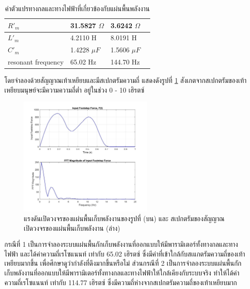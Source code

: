 \documentclass[11pt,a4paper]{article}
\begin{document}
\begin{table}[H]
\begin{tabular}{ | l | l | l | p{5cm} |}
        $R'_{m}$                                 & 31.5827 $\Omega$           & 3.6242 $\Omega$            \\ \hline
        $L'_{m}$                                 & 4.2110 H                   & 8.0191 H                   \\ \hline
        $C'_{m}$                                 & 1.4228 $\mu F$             & 1.5606 $\mu F$             \\ \hline
        resonant frequency                       & 65.02 Hz                   & 144.70 Hz                  \\ \hline
    \end{tabular}
    \caption{ค่าตัวแปรทางกลและทางไฟฟ้าที่เกี่ยวข้องกับแผ่นพื้นพลังงาน \cite{GpH:01}}
    \label{para_dc}
\end{table}

โดยจำลองด้วยสัญญาณเท้าเหยียบและมีสเปกตรัมความถี่ แสดงดังรูปที่ \ref{spectrum_foot_step} สังเกตจากสเปกตรัมของเท้าเหยียบมนุษย์จะมีความความถี่ต่ำ อยู่ในช่วง 0 - 10 เฮิรตซ์
\begin{figure}[H]
    \begin{center}
        \includegraphics[width=0.6\textwidth]{spectrum_foot_step.jpg}
    \end{center}
    \caption{แรงดันเปิดวงจรของแผ่นพื้นเก็บพลังงานของรูปที่ (บน) และ สเปกตรัมของสัญญาณเปิดวงจรของแผ่นพื้นเก็บพลังงาน (ล่าง)}
    \label{spectrum_foot_step}
\end{figure}

กรณีที่ 1 เป็นการจำลองระบบแผ่นพื้นกักเก็บพลังงานที่ออกแบบให้มีพารามิเตอร์ทั้งทางกลและทางไฟฟ้า และได้ค่าความถี่เรโซแนนท์ เท่ากับ 65.02 เฮิรตซ์ ซึ่งมีค่าที่เข้าใกล้กับสเแกตรัมความถี่ของเท้าเหยียบมากขึ้น เพื่อศึกษาดูว่ากำลังที่ดึงมากขึ้นหรือไม่
ส่วนกรณีที่ 2 เป็นการจำลองระบบแผ่นพื้นกักเก็บพลังงานที่ออกแบบให้มีพารามิเตอร์ทั้งทางกลและทางไฟฟ้าให้ใกล้เคียงกับระบบจริง ทำให้ได้ค่าความถี่เรโซแนนท์ เท่ากับ 114.77 เฮิรตซ์ ซึ่งมีความถี่ห่างจากสเปกตรัมความถี่ของเท้าเหยียบมาก
\end{document}
